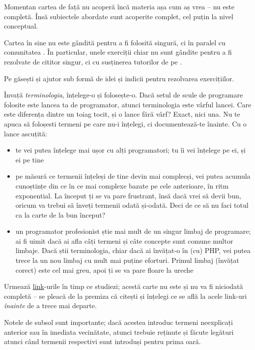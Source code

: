 Momentan cartea de față nu acoperă încă materia așa cum aș vrea -- nu este completă.
Însă subiectele abordate sunt acoperite complet, cel puțin la nivel conceptual.

Cartea în sine nu este gândită pentru a fi folosită singură, ci
în paralel cu comunitatea \phpro. În particular, unele exerciții
chiar nu sunt gândite pentru a fi rezolvate de cititor singur,
ci cu susținerea tutorilor de pe \phpro.

Pe {\phpro} găsești și ajutor sub formă de idei și indicii pentru rezolvarea
exercițiilor.

Învață \textit{terminologia}, înțelege-o și folosește-o. Dacă setul de scule de programare folosite
este lancea ta de programator, atunci terminologia este vârful lancei.
Care este diferența dintre un toiag tocit, și o lance fără vârf?
Exact, nici una. Nu te apuca să foloșesti termeni pe care nu-i înțelegi,
ci documentează-te înainte. Cu o lance ascuțită:
\begin{itemize}
	\item te vei putea înțelege mai ușor cu alți programatori; tu îi vei înțelege pe ei, și ei pe tine
	\item pe măsură ce termenii înțeleși de tine devin mai complecși,
		  vei putea acumula cunoștințe din ce în ce mai complexe bazate pe cele anterioare,
		  în ritm exponential. La început ți se va pare frustrant, însă dacă vrei să devii bun,
		  oricum va trebui să înveți termenii odată și-odată. Deci de ce să nu faci totul ca
		  la carte de la bun început?
	\item un programator profesionist știe mai mult de un singur limbaj de programare; ai fi
		  uimit dacă ai afla câți termeni și câte concepte sunt comune multor limbaje. Dacă
		  știi terminologia, chiar dacă ai învățat-o în (cu) PHP, vei putea trece la un nou
		  limbaj cu mult mai puține eforturi. Primul limbaj (învățat corect) este cel mai greu,
		  apoi ți se va pare floare la ureche
\end{itemize}


Urmează \href{http://en.wikipedia.org/wiki/Hyperlink}{link}-urile în timp ce
studiezi;
acestă carte nu este și nu va fi niciodată {\glqq}completă{\grqq} -- se pleacă de la premiza
că citești și înțelegi ce se află la acele link-uri \textit{înainte} de a trece
mai departe.

Notele de subsol sunt importante; dacă acestea introduc termeni neexplicați
anterior sau în imediata vecinătate, atunci trebuie reținute și făcute
legături atunci când termenii respectivi sunt introduși pentru prima oară.


